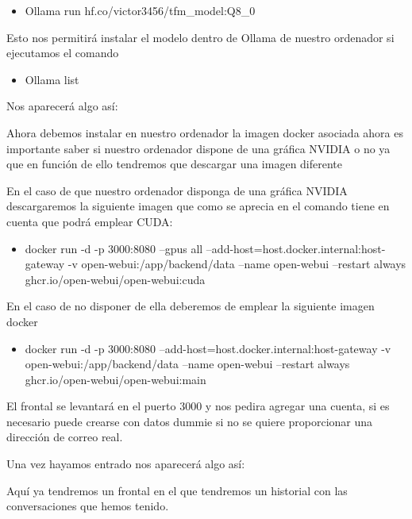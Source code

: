 \begin{itemize}
    \item Ollama run hf.co/victor3456/tfm\_model:Q8\_0
\end{itemize}

Esto nos permitirá instalar el modelo dentro de Ollama de nuestro ordenador si ejecutamos el comando
\begin{itemize}
    \item Ollama list
\end{itemize}

Nos aparecerá algo así:


Ahora debemos instalar en nuestro ordenador la imagen docker asociada ahora es importante saber si nuestro ordenador dispone de una gráfica NVIDIA o no ya que en función de ello tendremos que descargar una imagen diferente

En el caso de que nuestro ordenador disponga de una gráfica NVIDIA descargaremos la siguiente imagen que como se aprecia en el comando tiene en cuenta que podrá emplear CUDA:

\begin{itemize}
    \item docker run -d -p 3000:8080 --gpus all --add-host=host.docker.internal:host-gateway -v open-webui:/app/backend/data --name open-webui --restart always ghcr.io/open-webui/open-webui:cuda
\end{itemize}

En el caso de no disponer de ella deberemos de emplear la siguiente imagen docker

\begin{itemize}
    \item docker run -d -p 3000:8080 --add-host=host.docker.internal:host-gateway -v open-webui:/app/backend/data --name open-webui --restart always ghcr.io/open-webui/open-webui:main
\end{itemize}

El frontal se levantará en el puerto 3000 y nos pedira agregar una cuenta, si es necesario puede crearse con datos dummie si no se quiere proporcionar una dirección de correo real.

Una vez hayamos entrado nos aparecerá algo así:


Aquí ya tendremos un frontal en el que tendremos un historial con las conversaciones que hemos tenido.





